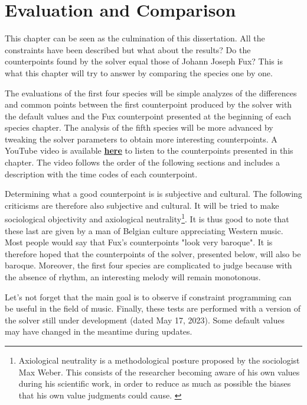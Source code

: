 \chapter{Evaluation and Comparison}
This chapter can be seen as the culmination of this dissertation. All the constraints have been described but what about the results? Do the counterpoints found by the solver equal those of Johann Joseph Fux? This is what this chapter will try to answer by comparing the species one by one.

The evaluations of the first four species will be simple analyzes of the differences and common points between the first counterpoint produced by the solver with the default values and the Fux counterpoint presented at the beginning of each species chapter. The analysis of the fifth species will be more advanced by tweaking the solver parameters to obtain more interesting counterpoints. A YouTube video is available \textbf{\href{https://youtu.be/9yB4OGr4Cgk}{here}}\parencite{EvalYT} to listen to the counterpoints presented in this chapter. The video follows the order of the following sections and includes a description with the time codes of each counterpoint.

Determining what a good counterpoint is is subjective and cultural. The following criticisms are therefore also subjective and cultural. It will be tried to make sociological objectivity and axiological neutrality\footnote{Axiological neutrality is a methodological posture proposed by the sociologist Max Weber. This consists of the researcher becoming aware of his own values during his scientific work, in order to reduce as much as possible the biases that his own value judgments could cause. \parencite{AxioNeut}}. It is thus good to note that these last are given by a man of Belgian culture appreciating Western music. Most people would say that Fux's counterpoints "look very baroque". It is therefore hoped that the counterpoints of the solver, presented below, will also be baroque. Moreover, the first four species are complicated to judge because with the absence of rhythm, an interesting melody will remain monotonous.

Let's not forget that the main goal is to observe if constraint programming can be useful in the field of music. Finally, these tests are performed with a version of the solver still under development (dated May 17, 2023). Some default values may have changed in the meantime during updates.


